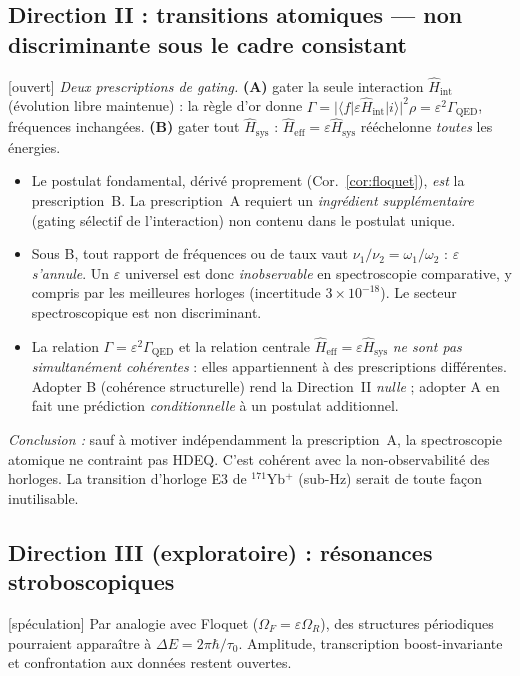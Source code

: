 \documentclass[11pt,a4paper]{article}
\newcommand{\Hsysop}{\hat{H}_{\mathrm{sys}}}
\newcommand{\Heff}{\hat{H}_{\mathrm{eff}}}
\newcommand{\statut}[1]{{\footnotesize\textsf{[#1]}}}
\theoremstyle{plain}
\theoremstyle{definition}
\theoremstyle{remark}
\begin{document}
\subsection{Direction II : transitions atomiques --- non discriminante sous le cadre consistant}
\statut{ouvert} \emph{Deux prescriptions de gating.} \textbf{(A)} gater la seule
interaction $\hat H_{\mathrm{int}}$ (\'evolution libre maintenue) : la r\`egle d'or donne
$\Gamma=|\langle f|\varepsilon\hat H_{\mathrm{int}}|i\rangle|^2\rho
=\varepsilon^2\Gamma_{\mathrm{QED}}$, fr\'equences inchang\'ees. \textbf{(B)} gater tout
$\Hsysop$ : $\Heff=\varepsilon\Hsysop$ r\'e\'echelonne \emph{toutes} les \'energies.
\begin{itemize}
\item Le postulat fondamental, d\'eriv\'e proprement (Cor.~\ref{cor:floquet}), \emph{est}
la prescription~B. La prescription~A requiert un \emph{ingr\'edient suppl\'ementaire}
(gating s\'electif de l'interaction) non contenu dans le postulat unique.
\item Sous B, tout rapport de fr\'equences ou de taux vaut $\nu_1/\nu_2=\omega_1/\omega_2$ :
$\varepsilon$ \emph{s'annule}. Un $\varepsilon$ universel est donc \emph{inobservable}
en spectroscopie comparative, y compris par les meilleures horloges (incertitude
$3\times10^{-18}$). Le secteur spectroscopique est non discriminant.
\item La relation $\Gamma=\varepsilon^2\Gamma_{\mathrm{QED}}$ et la relation centrale
$\Heff=\varepsilon\Hsysop$ \emph{ne sont pas simultan\'ement coh\'erentes} : elles
appartiennent \`a des prescriptions diff\'erentes. Adopter B (coh\'erence structurelle)
rend la Direction~II \emph{nulle} ; adopter A en fait une pr\'ediction \emph{conditionnelle}
\`a un postulat additionnel.
\end{itemize}
\emph{Conclusion :} sauf \`a motiver ind\'ependamment la prescription~A, la
spectroscopie atomique ne contraint pas HDEQ. C'est coh\'erent avec la non-observabilit\'e
des horloges. La transition d'horloge E3 de $^{171}$Yb$^+$ (sub-Hz) serait de toute
fa\c{c}on inutilisable.

\subsection{Direction III (exploratoire) : r\'esonances stroboscopiques}
\statut{sp\'eculation} Par analogie avec Floquet ($\Omega_F=\varepsilon\Omega_R$), des
structures p\'eriodiques pourraient appara\^itre \`a $\Delta E=2\pi\hbar/\tau_0$. Amplitude,
transcription boost-invariante et confrontation aux donn\'ees restent ouvertes.
\end{document}
